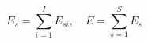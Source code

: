\begin{equation}\label{eq:sector_emission}
    E_s = \sum_{i=1}^I E_{si}, \quad E = \sum_{s=1}^S E_s
\end{equation}
